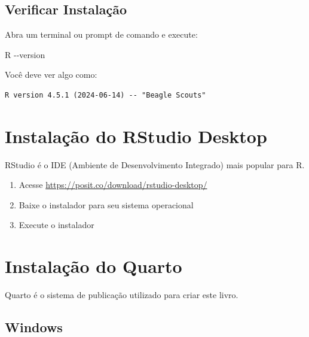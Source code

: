 \documentclass[
  letterpaper,
]{book}
\newenvironment{Shaded}{\begin{snugshade}}{\end{snugshade}}
\newcommand{\AttributeTok}[1]{\textcolor[rgb]{0.40,0.45,0.13}{#1}}
\newcommand{\ExtensionTok}[1]{\textcolor[rgb]{0.00,0.23,0.31}{#1}}
\providecommand{\tightlist}{%
  \setlength{\itemsep}{0pt}\setlength{\parskip}{0pt}}\usepackage{longtable,booktabs,array}
\begin{document}
\subsection*{Verificar Instalação}\label{verificar-instalauxe7uxe3o}

Abra um terminal ou prompt de comando e execute:

\begin{Shaded}
\begin{Highlighting}[]
\ExtensionTok{R} \AttributeTok{{-}{-}version}
\end{Highlighting}
\end{Shaded}

Você deve ver algo como:

\begin{verbatim}
R version 4.5.1 (2024-06-14) -- "Beagle Scouts"
\end{verbatim}

\section*{Instalação do RStudio
Desktop}\label{instalauxe7uxe3o-do-rstudio-desktop}


RStudio é o IDE (Ambiente de Desenvolvimento Integrado) mais popular
para R.

\begin{enumerate}
\def\labelenumi{\arabic{enumi}.}
\tightlist
\item
  Acesse \url{https://posit.co/download/rstudio-desktop/}
\item
  Baixe o instalador para seu sistema operacional
\item
  Execute o instalador
\end{enumerate}

\section*{Instalação do Quarto}\label{instalauxe7uxe3o-do-quarto}


Quarto é o sistema de publicação utilizado para criar este livro.

\subsection*{Windows}\label{windows-1}
\end{document}
